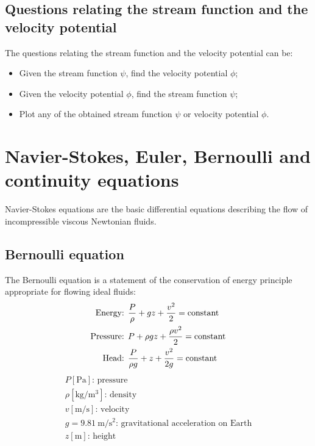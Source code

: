 \documentclass[10pt, twocolumn]{article}
\begin{document}
\subsection{Questions relating the stream function and the velocity potential}
The questions relating the stream function and the velocity potential can be:
\begin{itemize}
  \item Given the stream function \(\psi\), find the velocity potential \(\phi\);
  \item Given the velocity potential \(\phi\), find the stream function \(\psi\);
  \item Plot any of the obtained stream function \(\psi\) or velocity potential \(\phi\).
\end{itemize}


\section{Navier-Stokes, Euler, Bernoulli and continuity equations}
Navier-Stokes equations are the basic differential equations describing the flow of incompressible viscous Newtonian fluids.


\subsection{Bernoulli equation}
The Bernoulli equation is a statement of the conservation of energy principle appropriate for flowing ideal fluids:
\begin{align*}
  \text{Energy: }   & \frac{P}{\rho} + gz + \frac{v^2}{2}   = \mathrm{constant} \\
  \text{Pressure: } & P + \rho g z + \frac{\rho v^2}{2}     = \mathrm{constant} \\
  \text{Head: }     & \frac{P}{\rho g} + z + \frac{v^2}{2g} = \mathrm{constant} \\
\end{align*}
\[
  \begin{array}{|l}
    P [\si{\pascal}] \text{: pressure}                                                    \\
    \rho [\si{\kilogram\per\metre\cubed}] \text{: density}                                \\
    v [\si{\metre\per\second}] \text{: velocity}                                          \\
    g = \SI{9.81}{\metre\per\second\squared} \text{: gravitational acceleration on Earth} \\
    z [\si{\metre}] \text{: height}
  \end{array}
\]
\end{document}
